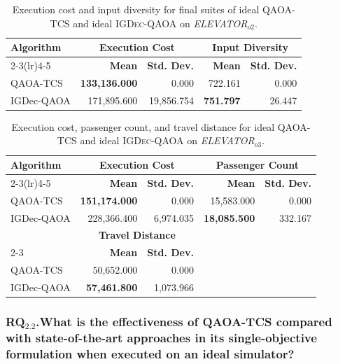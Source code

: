 \begin{table}[ht]
\centering
\caption{Execution cost and input diversity for final suites of ideal \textsc{QAOA-TCS} and ideal \textsc{IGDec-QAOA} on \textit{ELEVATOR$_{o2}$}.}
\label{tab:elevator_o2_metrics_nobackend}
\scriptsize
\begin{tabular}{lrrrr}
\toprule
\textbf{Algorithm} &
\multicolumn{2}{c}{\textbf{Execution Cost}} &
\multicolumn{2}{c}{\textbf{Input Diversity}} \\
\cmidrule(lr){2-3}\cmidrule(lr){4-5}
 & \textbf{Mean} & \textbf{Std. Dev.} & \textbf{Mean} & \textbf{Std. Dev.} \\
\midrule
QAOA-TCS   & \textbf{133,136.000} & 0.000     & 722.161 & 0.000 \\
IGDec-QAOA & 171,895.600 & 19,856.754 & \textbf{751.797} & 26.447 \\
\bottomrule
\end{tabular}
\end{table}

\begin{table}[ht]
\centering
\caption{Execution cost, passenger count, and travel distance for ideal \textsc{QAOA-TCS} and ideal \textsc{IGDec-QAOA} on \textit{ELEVATOR$_{o3}$}.}
\label{tab:elevator_o3_metrics_nobackend}
\scriptsize
\begin{tabular}{lrrrr}
\toprule
\textbf{Algorithm} &
\multicolumn{2}{c}{\textbf{Execution Cost}} &
\multicolumn{2}{c}{\textbf{Passenger Count}} \\
\cmidrule(lr){2-3}\cmidrule(lr){4-5}
 & \textbf{Mean} & \textbf{Std. Dev.} & \textbf{Mean} & \textbf{Std. Dev.} \\
\midrule
QAOA-TCS   & \textbf{151,174.000} & 0.000    & 15,583.000 & 0.000 \\
IGDec-QAOA & 228,366.400 & 6,974.035 & \textbf{18,085.500} & 332.167 \\
\midrule
\multicolumn{1}{l}{} & \multicolumn{2}{c}{\textbf{Travel Distance}} & \multicolumn{2}{l}{} \\
\cmidrule(lr){2-3}
\multicolumn{1}{l}{} & \textbf{Mean} & \textbf{Std. Dev.} & \multicolumn{2}{l}{} \\
QAOA-TCS   & 50,652.000 & 0.000 & \multicolumn{2}{l}{} \\
IGDec-QAOA & \textbf{57,461.800} & 1,073.966 & \multicolumn{2}{l}{} \\
\bottomrule
\end{tabular}
\end{table}


\subsubsection{RQ$_{2.2}$.What is the effectiveness of \textsc{QAOA-TCS} compared with state-of-the-art approaches in its single-objective formulation when executed on an ideal simulator?}


